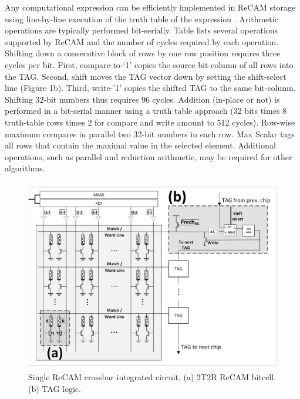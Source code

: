 \documentclass{superfri}
\begin{document}
Any computational expression can be efficiently implemented in ReCAM storage using line-by-line execution of the truth table of the expression \cite{balasubramonian2014near}. Arithmetic operations are typically performed bit-serially. Table  lists several operations supported by ReCAM and the number of cycles required by each operation.  Shifting down a consecutive block of rows by one row position requires three cycles per bit. First, compare-to-‘1' copies the source bit-column of all rows into the TAG. Second, shift moves the TAG vector down by setting the shift-select line (Figure 1b). Third, write-'1' copies the shifted TAG to the same bit-column. Shifting 32-bit numbers thus requires 96 cycles. Addition (in-place or not) is performed in a bit-serial manner using a truth table approach \cite{balasubramonian2014near} (32 bits times 8 truth-table rows times 2 for compare and write amount to 512 cycles). Row-wise maximum compares in parallel two 32-bit numbers in each row. Max Scalar tags all rows that contain the maximal value in the selected element. Additional operations, such as parallel and reduction arithmetic, may be required for other algorithms. 



\begin{figure}[h!]
	\centerline{\includegraphics[scale=0.4]{Figures/ReCAM_array.jpg}}
	\caption{Single ReCAM crossbar integrated circuit. (a) 2T2R ReCAM bitcell. (b) TAG logic.}
	\label{fig:ReCAM_IC}
\end{figure}
\end{document}
